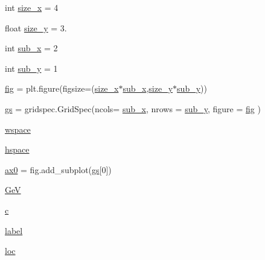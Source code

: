 \begin{DoxyCompactItemize}
\item 
int \hyperlink{namespaceEscapeModel__protons__2_ac08e47354c7012b47a21c29fb73f2463}{size\+\_\+x} = 4
\item 
float \hyperlink{namespaceEscapeModel__protons__2_a02f2dcd8486eb2dcb27586989af55827}{size\+\_\+y} = 3.
\item 
int \hyperlink{namespaceEscapeModel__protons__2_a799ad0706a435c1ea37e8a7a83eba68c}{sub\+\_\+x} = 2
\item 
int \hyperlink{namespaceEscapeModel__protons__2_aac43310b10312443e458577ea9d77a1a}{sub\+\_\+y} = 1
\item 
\hyperlink{namespaceEscapeModel__protons__2_ab9e89e306207ef87dfe97dcc618ba79f}{fig} = plt.\+figure(figsize=(\hyperlink{namespaceEscapeModel__protons__2_ac08e47354c7012b47a21c29fb73f2463}{size\+\_\+x}$\ast$\hyperlink{namespaceEscapeModel__protons__2_a799ad0706a435c1ea37e8a7a83eba68c}{sub\+\_\+x},\hyperlink{namespaceEscapeModel__protons__2_a02f2dcd8486eb2dcb27586989af55827}{size\+\_\+y}$\ast$\hyperlink{namespaceEscapeModel__protons__2_aac43310b10312443e458577ea9d77a1a}{sub\+\_\+y}))
\item 
\hyperlink{namespaceEscapeModel__protons__2_ac78144ff63b1cfafc81865301d7900d4}{gs} = gridspec.\+Grid\+Spec(ncols= \hyperlink{namespaceEscapeModel__protons__2_a799ad0706a435c1ea37e8a7a83eba68c}{sub\+\_\+x}, nrows = \hyperlink{namespaceEscapeModel__protons__2_aac43310b10312443e458577ea9d77a1a}{sub\+\_\+y}, figure = \hyperlink{namespaceEscapeModel__protons__2_ab9e89e306207ef87dfe97dcc618ba79f}{fig} )
\item 
\hyperlink{namespaceEscapeModel__protons__2_a65333655f63001669eda448cb221f3c8}{wspace}
\item 
\hyperlink{namespaceEscapeModel__protons__2_a15441b30802074923e94f3ce5b49f0ee}{hspace}
\item 
\hyperlink{namespaceEscapeModel__protons__2_a179e755e28c921a47fb2c3faa57f9900}{ax0} = fig.\+add\+\_\+subplot(\hyperlink{namespaceEscapeModel__protons__2_ac78144ff63b1cfafc81865301d7900d4}{gs}\mbox{[}0\mbox{]})
\item 
\hyperlink{namespaceEscapeModel__protons__2_a2bc06724f2b8a0c43eb07274776fab7b}{GeV}
\item 
\hyperlink{namespaceEscapeModel__protons__2_abd7cbb1049563348d9008801f9da42d1}{c}
\item 
\hyperlink{namespaceEscapeModel__protons__2_a46619ab4c9abddd494cbefabcd240543}{label}
\item 
\hyperlink{namespaceEscapeModel__protons__2_ad081e8b8b980896304996ce013c82c19}{loc}

\end{DoxyCompactItemize}
